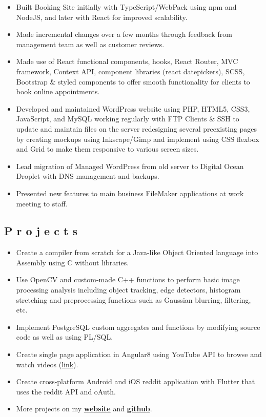 \documentclass{resume}
\begin{document}
\begin{itemize}
\item \small \raggedright Built Booking Site initially with TypeScript/WebPack using npm and NodeJS, and later with React for improved scalability.
\item \small \raggedright Made incremental changes over a few months through feedback from management team as well as customer reviews.
\item \small \raggedright Made use of React functional components, hooks, React Router, MVC framework, Context API, component libraries (react datepickers), SCSS, Bootstrap \& styled components to offer smooth functionality for clients to book online appointments.
\item \small \raggedright Developed and maintained WordPress website using PHP, HTML5, CSS3, JavaScript, and MySQL working regularly with FTP Clients \& SSH to update and maintain files on the server redesigning several preexisting pages by creating mockups using Inkscape/Gimp and implement using CSS flexbox and Grid to make them responsive to various screen sizes.
\item \small \raggedright Lead migration of Managed WordPress from old server to Digital Ocean Droplet with DNS management and backups.
\item \small \raggedright Presented new features to main business FileMaker applications at work meeting to staff.
\end{itemize}


\subsection{P r o j e c t s}
\begin{itemize}
\item \small Create a compiler from scratch for a Java-like Object Oriented language into Assembly using C without libraries.
\item \small Use OpenCV and custom-made C++ functions to perform basic image processing analysis including object tracking, edge detectors, histogram stretching and preprocessing functions such as Gaussian blurring, filtering, etc.
\item \small Implement PostgreSQL custom aggregates and functions by modifying source code as well as using PL/SQL.
\item \small Create single page application in Angular8 using YouTube API to browse and watch videos (\href{https://github.com/mushfiq814/youtube-data-api-dogVids}{link}).
\item \small Create cross-platform Android and iOS reddit application with Flutter that uses the reddit API and oAuth.
\item \small More projects on my \href{https://mushfiqmahmud.com/html/projects}{\textbf{website}} and \href{https://github.com/mushfiq814}{\textbf{github}}.
\end{itemize}

\end{document}
